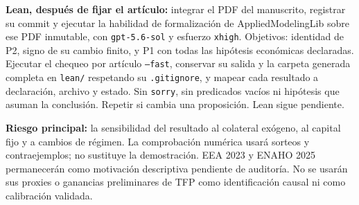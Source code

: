 \documentclass[11pt]{article}
\begin{document}
\textbf{Lean, despu\'es de fijar el art\'iculo:} integrar el PDF del manuscrito,
registrar su commit y ejecutar la habilidad de formalizaci\'on de
AppliedModelingLib sobre ese PDF inmutable, con \texttt{gpt-5.6-sol} y esfuerzo
\texttt{xhigh}. Objetivos: identidad de P2, signo de su cambio finito, y P1
con todas las hip\'otesis econ\'omicas declaradas. Ejecutar el chequeo por
art\'iculo \texttt{--fast}, conservar su salida y la carpeta generada completa
en \texttt{lean/} respetando su
\texttt{.gitignore}, y mapear cada resultado a declaraci\'on, archivo y estado.
Sin \texttt{sorry}, sin predicados vac\'ios ni hip\'otesis que asuman la conclusi\'on.
Repetir si cambia una proposici\'on. Lean sigue pendiente.

\textbf{Riesgo principal:} la sensibilidad del resultado al colateral
ex\'ogeno, al capital fijo y a cambios de r\'egimen. La comprobaci\'on num\'erica
usar\'a sorteos y contraejemplos; no sustituye la demostraci\'on.
EEA 2023 y ENAHO 2025 permanecer\'an como motivaci\'on descriptiva pendiente de
auditor\'ia. No se usar\'an sus proxies o ganancias preliminares de TFP como
identificaci\'on causal ni como calibraci\'on validada.


\end{document}
